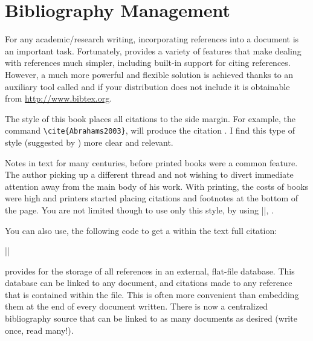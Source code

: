 \chapter{Bibliography Management} 
\begin{refsection}
 


For any academic/research writing, incorporating references into a document is an important task. Fortunately, \latex provides  a variety of features that make dealing with references much simpler, including built-in support for citing references. However, a much more powerful and flexible solution is achieved thanks to an auxiliary tool called \bibtex and if your \latex  distribution does not include it is obtainable from \url{http://www.bibtex.org}.


The style of this book places all citations to the side margin. For example, the command  \verb+\cite{Abrahams2003}+, will produce the citation \cite{Abrahams2003}. I find this type of style (suggested by \cite{Tufte1997}) more clear and relevant.

Notes in text for many centuries, before printed books were a common feature. The author picking up a different thread and not wishing to divert immediate attention away from the main body of his work. With printing, the costs of books were high and printers started placing citations and footnotes at the bottom of the page. You are not limited though to use only this style, by using |\cite{Bringhurst2005}|, \citet{Bringhurst2005}.

You can also use, the following code to get a within the text full citation:


||



\bibtex provides for the storage of all references in an external, flat-file database. This database can be linked to any \latex document, and citations made to any reference that is contained within the file. This is often more convenient than embedding them at the end of every document written. There is now a centralized bibliography source that can be linked to as many documents as desired (write once, read many!). 


\end{refsection}
